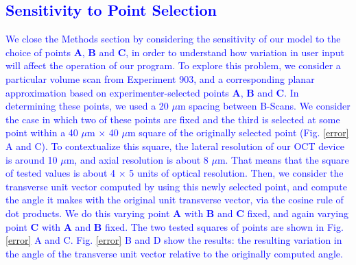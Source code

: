 \documentclass[preprint,NumberedRefs]{JASA}
\begin{document}
\subsection{\textcolor{blue}{Sensitivity to Point Selection}}
\par{\textcolor{blue}{We close the Methods section by considering the sensitivity of our model to the choice of points $\mathbf{A}$, $\mathbf{B}$ and $\mathbf{C}$, in order to understand how variation in user input will affect the operation of our program. To explore this problem, we consider a particular volume scan from Experiment 903, and a corresponding planar approximation based on experimenter-selected points $\mathbf{A}$, $\mathbf{B}$ and $\mathbf{C}$. In determining these points, we used a 20 $\mu$m spacing between B-Scans. We consider the case in which two of these points are fixed and the third is selected at some point within a 40 $\mu$m $\times$ 40 $\mu$m square of the originally selected point (Fig. \ref{error} A and C). To contextualize this square, the lateral resolution of our OCT device is around 10 $\mu$m, and axial resolution is about 8 $\mu$m. That means that the square of tested values is about 4 $\times$ 5 units of optical resolution. Then, we consider the transverse unit vector computed by using this newly selected point, and compute the angle it makes with the original unit transverse vector, via the cosine rule of dot products. We do this %
varying point $\mathbf{A}$ with $\mathbf{B}$ and $\mathbf{C}$ fixed, and again varying point $\mathbf{C}$ with $\mathbf{A}$ and $\mathbf{B}$ fixed. The two tested squares of points are shown in Fig. \ref{error} A and C. Fig. \ref{error} B and D show the results: the resulting variation in the angle of the transverse unit vector relative to the originally computed angle.}}
\end{document}
